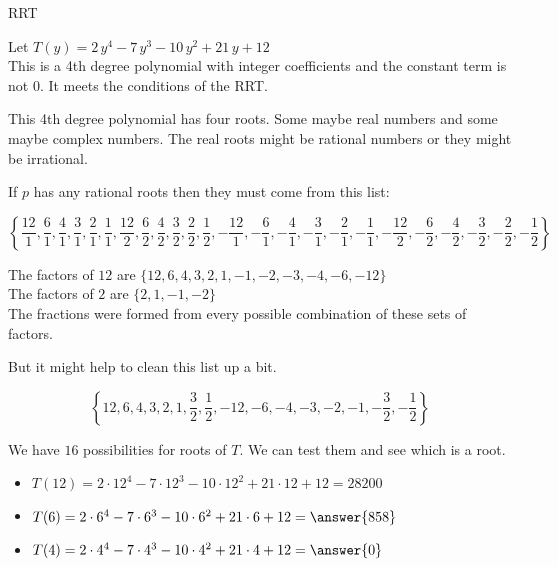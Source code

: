 \documentclass{ximera}
\begin{document}
\begin{example} RRT


Let $T(y) = 2\, y^4 - 7 \, y^3 - 10 \, y^2 + 21 \, y + 12$ \\


This is a 4th degree polynomial with integer coefficients and the constant term is not $0$. It meets the conditions of the RRT.


This 4th degree polynomial has four roots.  Some maybe real numbers and some maybe complex numbers. The real roots might be rational numbers or they might be irrational.

If $p$ has any rational roots then they must come from this list:




\[
\left\{  \frac{12}{1},  \frac{6}{1}, \frac{4}{1}, \frac{3}{1}, \frac{2}{1}, \frac{1}{1}, \frac{12}{2},  \frac{6}{2}, \frac{4}{2}, \frac{3}{2}, \frac{2}{2}, \frac{1}{2},  -\frac{12}{1},  -\frac{6}{1}, -\frac{4}{1}, -\frac{3}{1}, -\frac{2}{1}, -\frac{1}{1}, -\frac{12}{2},  -\frac{6}{2}, -\frac{4}{2}, -\frac{3}{2}, -\frac{2}{2}, -\frac{1}{2}                 \right\}
\]


The factors of $12$ are $\{ 12, 6, 4, 3, 2, 1, -1, -2, -3, -4, -6, -12 \}$ \\

The factors of $2$ are $\{ 2, 1, -1, -2 \}$ \\


The fractions were formed from every possible combination of these sets of factors.

But it might help to clean this list up a bit.

\[
\left\{  12,  6, 4, 3, 2, 1,  \frac{3}{2},  \frac{1}{2},  -12,  -6, -4, -3, -2, -1,  -\frac{3}{2},  -\frac{1}{2}                 \right\}
\]





We have $16$ possibilities for roots of $T$.  We can test them and see which is a root.










\begin{itemize}
\item $T(12) =  2 \cdot 12^4 - 7 \cdot 12^3 - 10 \cdot 12^2 + 21 \cdot 12 + 12 = 28200$ \\
\item $T(6) =  2 \cdot 6^4 - 7 \cdot 6^3 - 10 \cdot 6^2 + 21 \cdot 6 + 12 = \answer{858}$  \\
\item $T(4) =  2 \cdot 4^4 - 7 \cdot 4^3 - 10 \cdot 4^2 + 21 \cdot 4 + 12 = \answer{0}$  \\
\end{itemize}



\end{example}
\end{document}
